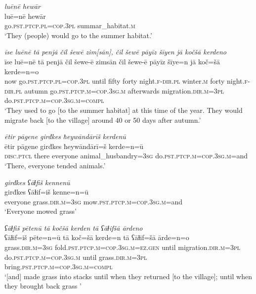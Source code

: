 \ea \label{ŽE.8}
\textit{luēnē hewār} \\ 
\gll luē=nē hewār \\ 
 go\textsc{.pst}\textsc{.ptcp}\textsc{.pl}\textsc{=cop}\textsc{.3pl} summar\_habitat\textsc{.m} \\ 
\glt `They (people) would go to the summer habitat.'
\z 
 
\ea \label{ŽE.9}
\textit{īse luēnē tā penjā čil šewē zim[sān], čil šewē pāyīz šīyen jā kočšā kerdeno} \\ 
\gll īse luē=nē tā penjā čil šewe-ē zimsān čil šewe-ē pāyīz šīye=n jā koč=šā kerde=n=o \\ 
 now go\textsc{.pst}\textsc{.ptcp}\textsc{.pl}\textsc{=cop}\textsc{.3pl} until fifty forty night\textsc{.f}\textsc{-dir}\textsc{.pl} winter\textsc{.m} forty night\textsc{.f}\textsc{-dir}\textsc{.pl} autumn go\textsc{.pst}\textsc{.ptcp}\textsc{.m}\textsc{=cop}\textsc{.3sg}\textsc{.m} afterwards migration\textsc{.dir}\textsc{.m}\textsc{=3pl} do\textsc{.pst}\textsc{.ptcp}\textsc{.m}\textsc{=cop}\textsc{.3sg}\textsc{.m}\textsc{=compl} \\ 
\glt `They used to go [to the summer habitat] at this time of the year. They would migrate back [to the village] around 40 or 50 days after autumn.'
\z 
 
\ea \label{ŽE.11}
\textit{ētir pāgene girđkes ħeywāndārīš kerdenū} \\ 
\gll ētir pāgene girđkes ħeywāndārī=š kerde=n=ū \\ 
 \textsc{disc.ptcl} there everyone animal\_husbandry\textsc{=3sg} do\textsc{.pst}\textsc{.ptcp}\textsc{.m}\textsc{=cop}\textsc{.3sg}\textsc{.m}=and \\ 
\glt `There, everyone tended animals.'
\z 
 
\ea \label{ŽE.12}
\textit{girđkes ʕāɫfiš kennenū} \\ 
\gll girđkes ʕāɫif=iš kenne=n=ū \\ 
 everyone grass\textsc{.dir}\textsc{.m}\textsc{=3sg} mow\textsc{.pst}\textsc{.ptcp}\textsc{.m}\textsc{=cop}\textsc{.3sg}\textsc{.m}=and \\ 
\glt `Everyone mowed grass'
\z 
 
\ea \label{ŽE.13}
\textit{ʕāɫfiš pētenū tā kočšā kerden tā ʕāɫifšā ārdeno} \\ 
\gll ʕāɫif=iš pēte=n=ū tā koč=šā kerde=n tā ʕāɫif=šā ārde=n=o \\ 
 grass\textsc{.dir}\textsc{.m}\textsc{=3sg} fold\textsc{.pst}\textsc{.ptcp}\textsc{.m}\textsc{=cop}\textsc{.3sg}\textsc{.m}\textsc{\textsc{=ez.gen}} until migration\textsc{.dir}\textsc{.m}\textsc{=3pl} do\textsc{.pst}\textsc{.ptcp}\textsc{.m}\textsc{=cop}\textsc{.3sg}\textsc{.m} until grass\textsc{.dir}\textsc{.m}\textsc{=3pl} bring\textsc{.pst}\textsc{.ptcp}\textsc{.m}\textsc{=cop}\textsc{.3sg}\textsc{.m}\textsc{=compl} \\ 
\glt `[and] made grass into stacks until when they returned [to the village]; until when they brought back grass '
\z 
 
